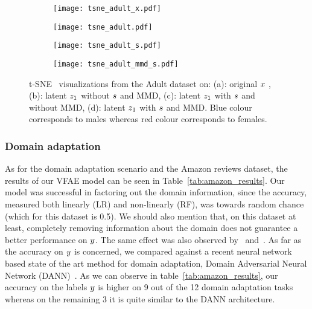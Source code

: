 \begin{figure}[h]
  \centering
  \begin{subfigure}{.25\textwidth}
        \centering
        \texttt{[image: tsne\_adult\_x.pdf]}
        \caption{}
        \label{fig:tsne_adult_x}
    \end{subfigure}\begin{subfigure}{.25\textwidth}
        \centering
        \texttt{[image: tsne\_adult.pdf]}
        \caption{}
        \label{fig:tsne_adult}
    \end{subfigure}\begin{subfigure}{.25\textwidth}
        \centering
        \texttt{[image: tsne\_adult\_s.pdf]}
        \caption{}
        \label{fig:tsne_adult_s}
    \end{subfigure}\begin{subfigure}{.25\textwidth}
        \centering
        \texttt{[image: tsne\_adult\_mmd\_s.pdf]}
        \caption{}
        \label{fig:tsne_adult_mmd_s}
    \end{subfigure}\caption{t-SNE~\citep{2013arXiv1301.3342V} visualizations from the Adult dataset on: (a): original $\*x$ , (b):  latent $\*z_1$  without $\*s$ and MMD, (c): latent $\*z_1$ with $\*s$ and without MMD, (d):  latent $\*z_1$ with $\*s$ and MMD. Blue colour corresponds to males whereas red colour corresponds to females.}
    \label{fig:tsne_adult_all}
\end{figure}

\subsubsection{Domain adaptation}
As for the domain adaptation scenario and the Amazon reviews dataset, the results of our VFAE model can be seen in Table~\ref{tab:amazon_results}. Our model was successful in factoring out the domain information, since the accuracy, measured both linearly (LR) and non-linearly (RF), was towards random chance (which for this dataset is 0.5).  We should also mention that, on this dataset at least, completely removing information about the domain does not guarantee a better performance on $\*y$. The same effect was also observed by~\cite{2015arXiv150507818G} and~\cite{chen2012marginalized}. As far as the accuracy on $\*y$ is concerned, we compared against a recent neural network based state of the art method for domain adaptation, Domain Adversarial Neural Network (DANN)~\citep{2015arXiv150507818G}. As we can observe in table~\ref{tab:amazon_results}, our accuracy on the labels $\*y$ is higher on 9 out of the 12 domain adaptation tasks whereas on the remaining 3 it is quite similar to the DANN architecture. 

